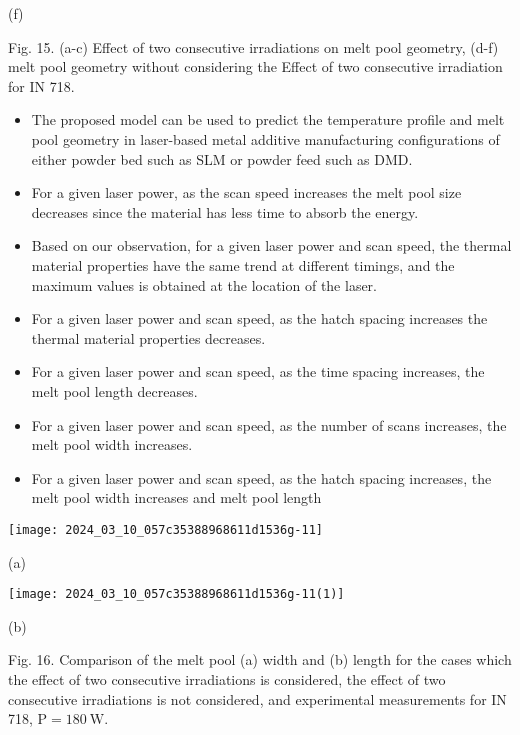 \documentclass[10pt]{article}
\begin{document}
(f)

Fig. 15. (a-c) Effect of two consecutive irradiations on melt pool geometry, (d-f) melt pool geometry without considering the Effect of two consecutive irradiation for IN 718.

\begin{itemize}
  \item The proposed model can be used to predict the temperature profile and melt pool geometry in laser-based metal additive manufacturing configurations of either powder bed such as SLM or powder feed such as DMD.

  \item For a given laser power, as the scan speed increases the melt pool size decreases since the material has less time to absorb the energy.

  \item Based on our observation, for a given laser power and scan speed, the thermal material properties have the same trend at different timings, and the maximum values is obtained at the location of the laser.

  \item For a given laser power and scan speed, as the hatch spacing increases the thermal material properties decreases.

  \item For a given laser power and scan speed, as the time spacing increases, the melt pool length decreases.

  \item For a given laser power and scan speed, as the number of scans increases, the melt pool width increases.

  \item For a given laser power and scan speed, as the hatch spacing increases, the melt pool width increases and melt pool length

\end{itemize}

\begin{center}
\texttt{[image: 2024\_03\_10\_057c35388968611d1536g-11]}
\end{center}

(a)

\begin{center}
\texttt{[image: 2024\_03\_10\_057c35388968611d1536g-11(1)]}
\end{center}

(b)

Fig. 16. Comparison of the melt pool (a) width and (b) length for the cases which the effect of two consecutive irradiations is considered, the effect of two consecutive irradiations is not considered, and experimental measurements for IN 718, $\mathrm{P}=180 \mathrm{~W}$.
\end{document}
